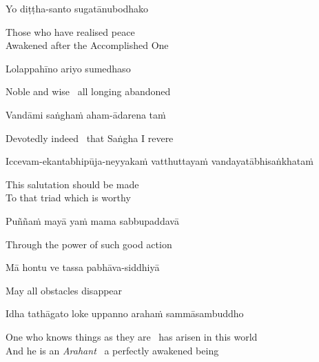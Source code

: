 Yo diṭṭha-santo sugatānubodhako

\begin{english}
  Those who have realised peace\\
  Awakened after the Accomplished One
\end{english}

Lolappahīno ariyo sumedhaso

\begin{english}
  Noble and wise \breathmark\ all longing abandoned
\end{english}

Vandāmi saṅghaṁ aham-ādarena taṁ

\begin{english}
  Devotedly indeed \breathmark\ that Saṅgha I revere
\end{english}

\begin{pali-hang}
  Iccevam-ekantabhipūja-neyyakaṁ vatthuttayaṁ vandayatābhisaṅkhataṁ
\end{pali-hang}

\begin{english}
  This salutation should be made\\
  To that triad\hyperlink{endnote11-appendix}{\hypertarget{endnote11-body}{}}
  which is worthy
\end{english}

Puññaṁ mayā yaṁ mama sabbupaddavā

\begin{english}
  Through the power of such good action
\end{english}

Mā hontu ve tassa pabhāva-siddhiyā

\begin{english}
  May all obstacles disappear
\end{english}

Idha tathāgato loke uppanno arahaṁ sammāsambuddho

\begin{english}
  One who knows things as they are \breathmark\ has arisen in this world\hyperlink{endnote12-appendix}{\hypertarget{endnote12-body}{}}\\
  And he is an \textit{Arahant} \breathmark\ a perfectly awakened being
\end{english}

